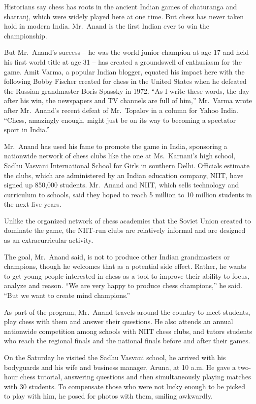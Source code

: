﻿\documentclass[12pt]{article}
\begin{document}
Historians say chess has roots in the ancient Indian games of chaturanga and shatranj, which were
widely played here at one time. But chess has never taken hold in modern India. Mr.~Anand is the
first Indian ever to win the championship.

But Mr.~Anand's success -- he was the world junior champion at age 17 and held his first world title
at age 31 -- has created a groundswell of enthusiasm for the game. Amit Varma, a popular Indian
blogger, equated his impact here with the following Bobby Fischer created for chess in the United
States when he defeated the Russian grandmaster Boris Spassky in 1972. ``As I write these words, the
day after his win, the newspapers and TV channels are full of him,'' Mr.~Varma wrote after
Mr.~Anand's recent defeat of Mr.~Topalov in a column for Yahoo India. ``Chess, amazingly enough,
might just be on its way to becoming a spectator sport in India.''

Mr.~Anand has used his fame to promote the game in India, sponsoring a nationwide network of chess
clubs like the one at Ms.~Karnani's high school, Sadhu Vasvani International School for Girls in
southern Delhi. Officials estimate the clubs, which are administered by an Indian education company,
NIIT, have signed up 850,000 students. Mr.~Anand and NIIT, which sells technology and curriculum to
schools, said they hoped to reach 5 million to 10 million students in the next five years.

Unlike the organized network of chess academies that the Soviet Union created to dominate the game,
the NIIT-run clubs are relatively informal and are designed as an extracurricular activity.

The goal, Mr.~Anand said, is not to produce other Indian grandmasters or champions, though he
welcomes that as a potential side effect. Rather, he wants to get young people interested in chess
as a tool to improve their ability to focus, analyze and reason. ``We are very happy to produce
chess champions,'' he said. ``But we want to create mind champions.''

As part of the program, Mr.~Anand travels around the country to meet students, play chess with them
and answer their questions. He also attends an annual nationwide competition among schools with NIIT
chess clubs, and tutors students who reach the regional finals and the national finals before and
after their games.

On the Saturday he visited the Sadhu Vasvani school, he arrived with his bodyguards and his wife and
business manager, Aruna, at 10 a.m. He gave a two-hour chess tutorial, answering questions and then
simultaneously playing matches with 30 students. To compensate those who were not lucky enough to be
picked to play with him, he posed for photos with them, smiling awkwardly.
\end{document}
